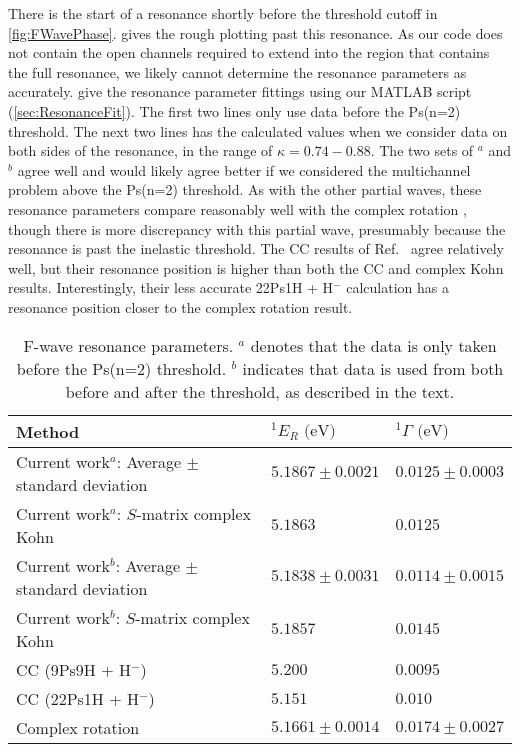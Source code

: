 \documentclass[Dissertation.tex]{subfiles}
\begin{document}
There is the start of a resonance shortly before the threshold cutoff in 
\cref{fig:FWavePhase}.  gives the rough 
plotting past this resonance. As our code does not contain the open channels 
required to extend into the region that contains the full resonance, 
we likely cannot determine the resonance parameters as accurately.
 give the resonance 
parameter fittings using our MATLAB script (\cref{sec:ResonanceFit}).
The first two lines only use data before the Ps(n=2) threshold. The next
two lines has the calculated values when we consider data on both sides of the
resonance, in the range of $\kappa = 0.74 - 0.88$. The two sets of $^a$ and
$^b$ agree well and would likely agree better if we considered the multichannel
problem above the Ps(n=2) threshold.
As with the other partial
waves, these resonance parameters compare reasonably well with the complex
rotation \cite{Ho2000}, though there is more discrepancy with this partial
wave, presumably because the resonance is past the inelastic threshold.
The CC results of Ref.~\cite{Walters2004} agree relatively well, but their
resonance position is higher than both the CC and complex Kohn results.
Interestingly, their less accurate 22Ps1H + H$^-$ calculation
\cite{Blackwood2002b} has a resonance position closer to the complex rotation
result.

\setlength{\abovecaptionskip}{6pt}   %
\setlength{\belowcaptionskip}{6pt}   %
\begin{table}[H]
\centering
\begin{tabular}{l l l}
\toprule
Method & $^1E_R \text{ (eV)}$ & $^1\Gamma \text{ (eV)}$ \\
\midrule
Current work$^a$: Average $\pm$ standard deviation & $5.1867 \pm 0.0021$ & $0.0125 \pm 0.0003$ \\
Current work$^a$: $S$-matrix complex Kohn & $5.1863$ & $0.0125$ \\
Current work$^b$: Average $\pm$ standard deviation & $5.1838 \pm 0.0031$ & $0.0114 \pm 0.0015$ \\
Current work$^b$: $S$-matrix complex Kohn & $5.1857$ & $0.0145$ \\
CC (9Ps9H + H$^-$) \cite{Walters2004} & $5.200$ & $0.0095$ \\
CC (22Ps1H + H$^-$) \cite{Blackwood2002b} & $5.151$ & $0.010$ \\
Complex rotation \cite{Ho2000} & $5.1661 \pm 0.0014$ & $0.0174 \pm 0.0027$  \\
\bottomrule
\end{tabular}
\caption[F-wave resonance parameters]{F-wave resonance parameters. $^a$ denotes that the data is only taken before the Ps(n=2) threshold.
$^b$ indicates that data is used from both before and after the threshold, as described in the text.}
\label{tab:FWaveResonanceComparisons}
\end{table}
\end{document}
